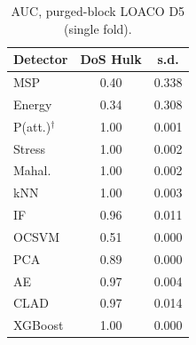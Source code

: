 \begin{table}[!t]
\centering
\scriptsize
\setlength{\tabcolsep}{2.6pt}
\caption{AUC, purged-block LOACO D5 (single fold).}
\label{tab:a_p5}
\begin{tabular}{lcc}
\toprule
Detector & DoS Hulk & s.d.\\
\midrule
MSP & 0.40 & 0.338\\
Energy & 0.34 & 0.308\\
P(att.)$^\dagger$ & 1.00 & 0.001\\
\midrule
Stress & 1.00 & 0.002\\
Mahal. & 1.00 & 0.002\\
kNN & 1.00 & 0.003\\
\midrule
IF & 0.96 & 0.011\\
OCSVM & 0.51 & 0.000\\
PCA & 0.89 & 0.000\\
AE & 0.97 & 0.004\\
\midrule
CLAD & 0.97 & 0.014\\
\midrule
XGBoost & 1.00 & 0.000\\
\bottomrule
\end{tabular}
\end{table}


